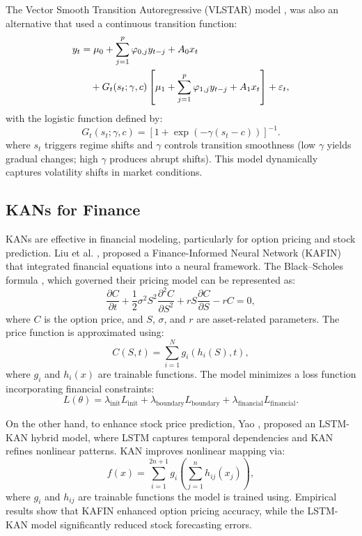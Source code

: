 \documentclass[conference,10pt]{IEEEtran}
\begin{document}
The Vector Smooth Transition Autoregressive (VLSTAR) model \cite{bucci2021market}, was also an alternative that used a continuous transition function:
\begin{align}
y_t &= \mu_0 + \sum_{j=1}^{p} \varphi_{0,j} y_{t-j} + A_0 x_t  \notag \\ 
&\quad + G_t(s_t; \gamma, c) \left[\mu_1 + \sum_{j=1}^{p} \varphi_{1,j} y_{t-j} + A_1 x_t \right] + \varepsilon_t,
\end{align}
with the logistic function defined by:
\begin{equation}
G_t(s_t; \gamma, c) = \left[1 + \exp(-\gamma(s_t - c))\right]^{-1}.
\end{equation}
where \( s_t \) triggers regime shifts and \( \gamma \) controls transition smoothness (low \( \gamma \) yields gradual changes; high \( \gamma \) produces abrupt shifts). This model dynamically captures volatility shifts in market conditions.

\subsection{KANs for Finance} 

KANs are effective in financial modeling, particularly for option pricing and stock prediction. Liu et al. \cite{liu2024kolmogorov}, proposed a Finance-Informed Neural Network (KAFIN) that integrated financial equations into a neural framework. The Black–Scholes formula \cite{barles1998option},  which governed their pricing model can be represented as:
\begin{equation}
\frac{\partial C}{\partial t} + \frac{1}{2} \sigma^2 S^2 \frac{\partial^2 C}{\partial S^2} + r S \frac{\partial C}{\partial S} - rC = 0,
\end{equation}
where \( C \) is the option price, and \( S \), \( \sigma \), and \( r \) are asset-related parameters. The price function is approximated using:
\begin{equation}
C(S, t) = \sum_{i=1}^{N} g_i(h_i(S), t),
\end{equation}
where \( g_i \) and \( h_i(x) \) are trainable functions. The model minimizes a loss function incorporating financial constraints:
\begin{equation}
L(\theta) = \lambda_{\text{init}} L_{\text{init}} + \lambda_{\text{boundary}} L_{\text{boundary}} + \lambda_{\text{financial}} L_{\text{financial}}.
\end{equation}

On the other hand, to enhance stock price prediction, Yao \cite{yao2024lstm}, proposed an LSTM-KAN hybrid model, where LSTM captures temporal dependencies and KAN refines nonlinear patterns. KAN improves nonlinear mapping via:
\begin{equation}
f(x) = \sum_{i=1}^{2n+1} g_i \left( \sum_{j=1}^{n} h_{ij}(x_j) \right),
\end{equation}
where \( g_i \) and \( h_{ij} \) are trainable functions the model is trained using.
Empirical results show that KAFIN enhanced option pricing accuracy, while the LSTM-KAN model significantly reduced stock forecasting errors.
\end{document}
